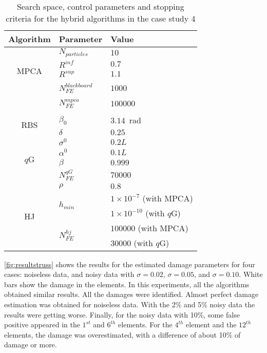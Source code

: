 \begin{table}[H]
\centering
\footnotesize
\caption{Search space, control parameters and stopping criteria for the hybrid algorithms in the case study 4}
\label{tab:param_t12}
\begin{tabular}{cll}
\hline
Algorithm & Parameter & Value \\
\hline
\multirow{5}{*}{MPCA} & $N_{particles}$ & $10$ \\
 & $R^{inf}$ & $0.7$ \\
 & $R^{sup}$ & $1.1$ \\
 \\[-0.7em]
 & $N_{FE}^{blackboard}$ & $1000$ \\
 \\[-0.7em]
 & $N_{FE}^{mpca}$ & $100000$ \\
 \\[-0.7em]
 \hline
\multirow{2}{*}{RBS} & $\beta_0$ & $3.14$~rad\\
 & $\delta$ & $0.25$\\
\hline
\multirow{4}{*}{$q$G} & $\sigma^0$ & $0.2 L$\\
 & $\alpha^0$ & $0.1 L$\\
 & $\beta$ & $0.999$\\
 & $N_{FE}^{qG}$ & $70000$ \\
\hline
\multirow{5}{*}{HJ} & $\rho $ & $0.8$ \\
 & \multirow{2}{*}{$h_{min}$} & $1 \times 10^{-7}$ (with MPCA) \\
 & & $1 \times 10^{-10}$ (with $q$G)\\
 & \multirow{2}{*}{$N_{FE}^{hj}$} & $100000$ (with MPCA) \\
 & & $30000$ (with $q$G) \\
\hline
\end{tabular}
\end{table}

\autoref{fig:resultstruss} shows the results for the estimated damage parameters for four cases: noiseless data, and noisy data with $\sigma = 0.02$, $\sigma = 0.05$, and $\sigma = 0.10$. White bars show the damage in the elements. In this experiments, all the algorithms obtained similar results. All the damages were identified. Almost perfect damage estimation was obtained for noiseless data. With the 2\% and 5\% noisy data the results were getting worse. Finally, for the noisy data with 10\%, some false positive appeared in the $1^{st}$ and $6^{th}$ elements. For the $4^{th}$ element and the $12^{th}$ elements, the damage was overestimated, with a difference of about 10\% of damage or more.

